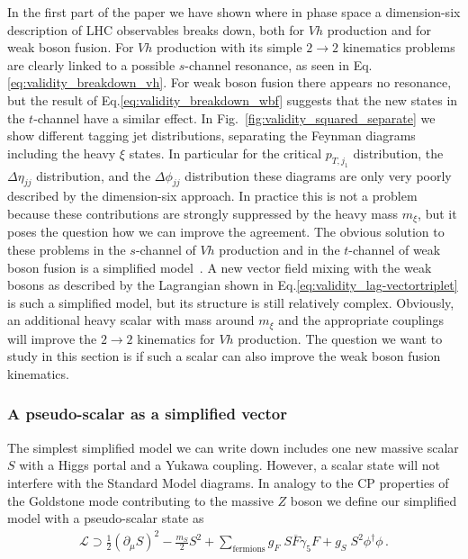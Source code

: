 In the first part of the paper we have shown where in phase space a
dimension-six description of LHC observables breaks down, both for $Vh$
production and for weak boson fusion. For $Vh$ production with its
simple $2 \to 2$ kinematics problems are clearly linked to a possible
$s$-channel resonance, as seen in Eq.\;\eqref{eq:validity_breakdown_vh}.  For
weak boson fusion there appears no resonance, but the result of
Eq.\;\eqref{eq:validity_breakdown_wbf} suggests that the new states in the
$t$-channel have a similar effect.  In Fig.~\ref{fig:validity_squared_separate}
we show different tagging jet distributions, separating the Feynman
diagrams including the heavy $\xi$ states. In particular for the
critical $p_{T,j_1}$ distribution, the $\Delta \eta_{jj}$
distribution, and the $\Delta \phi_{jj}$ distribution these diagrams
are only very poorly described by the dimension-six approach. In
practice this is not a problem because these contributions are
strongly suppressed by the heavy mass $m_\xi$, but it poses the
question how we can improve the agreement. The obvious solution to
these problems in the $s$-channel of $Vh$ production and in the
$t$-channel of weak boson fusion is a simplified
model~\cite{simp,simp_higgs}. A new vector field mixing with the weak
bosons as described by the Lagrangian shown in
Eq.\;\eqref{eq:validity_lag-vectortriplet} is such a simplified model, but its
structure is still relatively complex. Obviously, an additional heavy
scalar with mass around $m_\xi$ and the appropriate couplings will
improve the $2 \to 2$ kinematics for $Vh$ production. The question we
want to study in this section is if such a scalar can also improve the
weak boson fusion kinematics.



\subsubsection*{A pseudo-scalar as a simplified vector}

The simplest simplified model we can write down includes one new
massive scalar $S$ with a Higgs portal and a Yukawa coupling. 
However, a scalar state will not interfere with the Standard Model
diagrams. In analogy to the CP properties of the Goldstone mode
contributing to the massive $Z$ boson we define our simplified model
with a pseudo-scalar state as
%
\begin{align}
\mathcal{L} \supset 
  \frac{1}{2} (\partial_\mu S)^2 
- \frac{m_S}{2} S^2 
+ \sum_\text{fermions} g_F \; S \overline{F} \gamma_5 F 
+ g_S \; S^2 \phi^\dagger \phi \,.
  \label{eq:validity_simplified_model}
\end{align}

